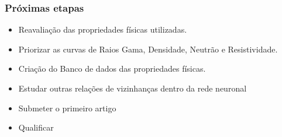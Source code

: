 \documentclass[aspectratio=10]{beamer} %
\begin{document}
\begin{frame}
	\frametitle{Próximas etapas}
	
	\begin{small}
		\begin{itemize}
			\item Reavaliação das propriedades físicas utilizadas.
			\pause
			\item Priorizar as curvas de Raios Gama, Densidade, Neutrão e Resistividade.
			\pause
			\item Criação do Banco de dados das propriedades físicas.
			\pause
			\item Estudar outras relações de vizinhanças dentro da rede neuronal
			\pause
			\item Submeter o primeiro artigo
			\pause
			\item Qualificar
			\end{itemize}
	\end{small}	
\end{frame}


\end{document}
